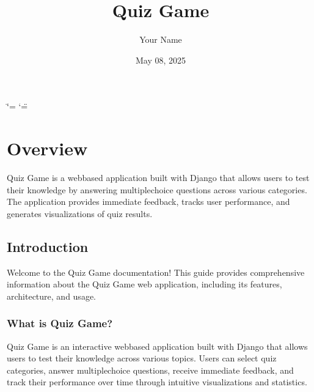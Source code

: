 \documentclass[letterpaper,10pt,english]{sphinxmanual}
\title{Quiz Game}
\date{May 08, 2025}
\author{Your Name}
\let\sphinxpxdimen\pdfpxdimen\else\newdimen\sphinxpxdimen
\begin{document}
\ifdefined\shorthandoff
  \ifnum\catcode`\=\string=\active\shorthandoff{=}\fi
  \ifnum\catcode`\"=\active{}\fi
\fi

\pagestyle{empty}
\sphinxmaketitle
\pagestyle{plain}
\sphinxtableofcontents
\pagestyle{normal}
\label{\detokenize{index::doc}}


\noindent{\hspace*{\fill}\sphinxincludegraphics[width=300\sphinxpxdimen]{{quiz_game_logo}.png}\hspace*{\fill}}


\chapter{Overview}
\label{\detokenize{index:overview}}
\sphinxAtStartPar
Quiz Game is a web\sphinxhyphen{}based application built with Django that allows users to test their knowledge
by answering multiple\sphinxhyphen{}choice questions across various categories. The application provides
immediate feedback, tracks user performance, and generates visualizations of quiz results.

\sphinxstepscope


\section{Introduction}
\label{\detokenize{introduction:introduction}}\label{\detokenize{introduction::doc}}
\sphinxAtStartPar
Welcome to the Quiz Game documentation! This guide provides comprehensive information
about the Quiz Game web application, including its features, architecture, and usage.


\subsection{What is Quiz Game?}
\label{\detokenize{introduction:what-is-quiz-game}}
\sphinxAtStartPar
Quiz Game is an interactive web\sphinxhyphen{}based application built with Django that allows users
to test their knowledge across various topics. Users can select quiz categories,
answer multiple\sphinxhyphen{}choice questions, receive immediate feedback, and track their performance
over time through intuitive visualizations and statistics.
\end{document}
